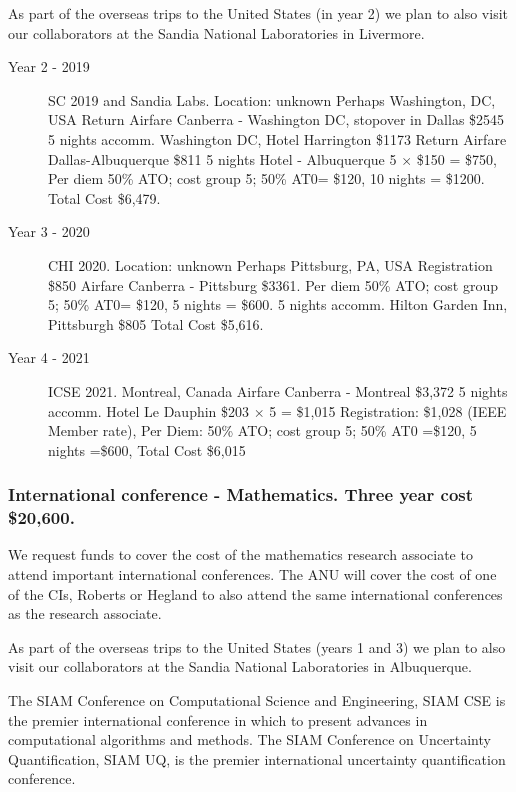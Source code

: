 \documentclass[a4paper,twoside,12pt,compact]{article}
\begin{document}
As part of the overseas trips to the United States (in year 2) we plan to also visit our collaborators at the Sandia National Laboratories in Livermore. 




\begin{description}




\item[Year 2 - 2019] SC 2019 and Sandia Labs.
Location: unknown
Perhaps Washington, DC, USA
Return Airfare Canberra - Washington DC, stopover in Dallas  \$2545
5 nights accomm. Washington DC, Hotel Harrington \$1173
Return Airfare Dallas-Albuquerque \$811
5 nights Hotel - Albuquerque 5 $\times$  \$150 = \$750,
Per diem 50\% ATO; cost group 5; 50\% AT0= \$120, 10 nights = \$1200. 
Total Cost \$6,479.

\item[Year 3 - 2020] CHI 2020.
Location: unknown 
Perhaps Pittsburg, PA, USA
Registration \$850 
Airfare Canberra - Pittsburg \$3361. 
Per diem 50\% ATO; cost group 5; 50\% AT0= \$120, 5 nights = \$600. 
5 nights accomm. Hilton Garden Inn, Pittsburgh \$805 
Total Cost \$5,616.

\item[Year 4 - 2021] ICSE 2021.
Montreal, Canada
Airfare Canberra - Montreal \$3,372
5 nights accomm. Hotel Le Dauphin \$203 $\times$ 5 = \$1,015
Registration: \$1,028 (IEEE Member rate),
Per Diem: 50\% ATO; cost group 5; 50\% AT0 =\$120, 5 nights =\$600,
Total Cost \$6,015


\end{description}


\subsubsection*{International conference - Mathematics. Three year cost \$20,600.}


We request funds to cover the cost of the mathematics research associate to attend important international conferences.  The ANU will cover the cost of one of the CIs, Roberts or Hegland to also attend the same international conferences as the research associate. 

As part of the overseas trips to the United States (years 1 and 3) we plan to also visit our collaborators at the Sandia National Laboratories in Albuquerque. 

The SIAM Conference on Computational Science and Engineering, SIAM CSE is the premier international conference in which to present advances in computational algorithms and methods. The SIAM Conference on Uncertainty Quantification, SIAM UQ, is the premier international uncertainty quantification conference.
\end{document}
